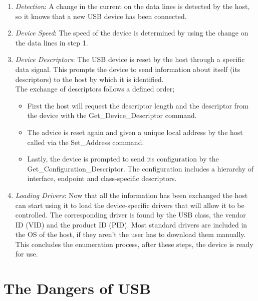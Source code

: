 \begin{enumerate}
    \item \emph{Detection}: A change in the current on the data lines is detected by the host, so it knows that a new USB device has been connected.
    \item \emph{Device Speed}: The speed of the device is determined by using the change on the data lines in step 1.
    \item \emph{Device Descriptors}: The USB device is reset by the host through a specific data signal. This prompts the device to send information about itself (its descriptors) to the host by which it is identified.  \\
    The exchange of descriptors follows a defined order; 
    \begin{itemize}
        \item First the host will request the descriptor length and the descriptor from the device with the Get\_Device\_Descriptor command.
        \item The advice is reset again and given a unique local address by the host called via the Set\_Address command. 
        \item Lastly, the device is prompted to send its configuration by the Get\_Configuration\_Descriptor. The configuration includes a hierarchy of interface, endpoint and class-specific descriptors.  
    \end{itemize}
    \item \emph{Loading Drivers}: Now that all the information has been exchanged the host can start using it to load the device-specific drivers that will allow it to be controlled. The corresponding driver is found by the USB class, the vendor ID (VID) and the product ID (PID). Most standard drivers are included in the OS of the host, if they aren't the user has to download them manually. This concludes the enumeration process, after these steps, the device is ready for use.
\end{enumerate}




\section{The Dangers of USB} \label{TheDangersOfUSB}


